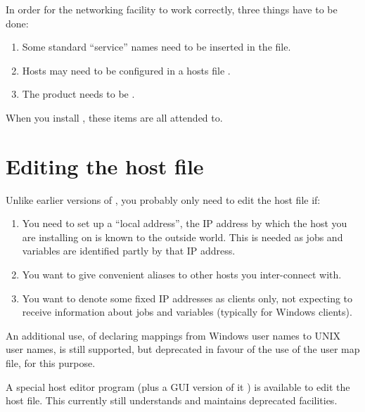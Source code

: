 In order for the networking facility to work correctly, three things have to be done:

\begin{enumerate}
\item Some standard ``service'' names need to be inserted in the  file.
\item Hosts may need to be configured in a hosts file \hostsfile{}.
\item The product needs to be .
\end{enumerate}
When you install \ProductName{} , these items are all
attended to.


\section{Editing the host file}
Unlike earlier versions of \ProductName{}, you probably only need to edit the
host file if:

\begin{enumerate}
\item You need to set up a ``local address'', the IP address by which the host you are
installing on is known to the outside world. This is needed as jobs and variables are identified partly by that IP address.
\item You want to give convenient aliases to other hosts you inter-connect with.
\item You want to denote some fixed IP addresses as clients only, not expecting to receive information about jobs
and variables (typically for Windows clients). 
\end{enumerate}
An additional use, of declaring mappings from Windows user names to UNIX user names, is still supported, but
deprecated in favour of the use of the user map file, \usermap{} for this purpose.

A special host editor program \PrHostedit{} (plus a GUI version of it \PrXhostedit) is available to
edit the host file. This currently still understands and maintains deprecated facilities.

